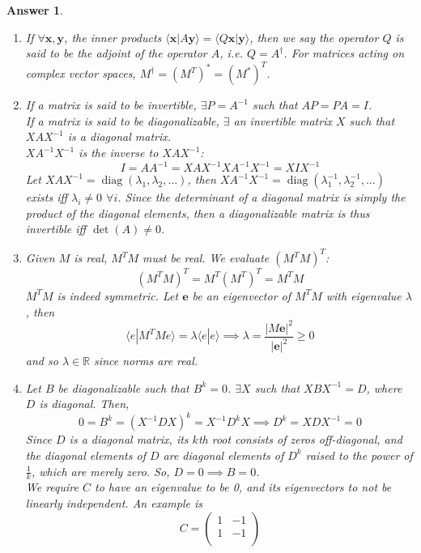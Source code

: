 \documentclass[a4paper]{article}
\DeclareMathOperator{\diag}{diag}
\newtheorem{ans}{Answer}[section]
\theoremstyle{new}
\begin{document}
\begin{ans}\leavevmode
\begin{enumerate}[label=(\alph*)]
\item If $\forall\mathbf{x},\mathbf{y}$, the inner products $\langle\mathbf{x}|A\mathbf{y}\rangle=\langle Q\mathbf{x}|\mathbf{y}\rangle$, then we say the operator $Q$ is said to be the adjoint of the operator $A$, i.e. $Q=A^\dag$. For matrices acting on complex vector spaces, $M^\dag=(M^T)^*=(M^*)^T$.
\item If a matrix is said to be invertible, $\exists P=A^{-1}$ such that $AP=PA=I$.\\[5pt]
If a matrix is said to be diagonalizable, $\exists$ an invertible matrix $X$ such that $XAX^{-1}$ is a diagonal matrix.\\[5pt]
$XA^{-1}X^{-1}$ is the inverse to $XAX^{-1}$:
$$I=AA^{-1}=XAX^{-1}XA^{-1}X^{-1}=XIX^{-1}$$
Let $XAX^{-1}=\diag(\lambda_1,\lambda_2,...)$, then $XA^{-1}X^{-1}=\diag(\lambda_1^{-1},\lambda_2^{-1},...)$ exists iff $\lambda_i\neq 0$ $\forall i$. Since the determinant of a diagonal matrix is simply the product of the diagonal elements, then a diagonalizable matrix is thus invertible iff $\det(A)\neq 0$.
\item Given $M$ is real, $M^TM$ must be real. We evaluate $(M^TM)^T$:
$$(M^TM)^T=M^T(M^T)^T=M^TM$$
$M^TM$ is indeed symmetric. Let $\mathbf{e}$ be an eigenvector of $M^TM$ with eigenvalue $\lambda$, then
$$\langle e|M^TMe\rangle=\lambda\langle e|e\rangle\implies\lambda=\frac{|M\mathbf{e}|^2}{|\mathbf{e}|^2}\geq0$$
and so $\lambda\in\mathbb{R}$ since norms are real.
\item Let $B$ be diagonalizable such that $B^k=0$. $\exists X$ such that $XBX^{-1}=D$, where $D$ is diagonal. Then,
$$0=B^k=(X^{-1}DX)^k=X^{-1}D^kX\implies D^k=XDX^{-1}=0$$
Since $D$ is a diagonal matrix, its $k$th root consists of zeros off-diagonal, and the diagonal elements of $D$ are diagonal elements of $D^k$ raised to the power of $\frac{1}{k}$, which are merely zero. So, $D=0\implies B=0$.\\[5pt]
We require $C$ to have an eigenvalue to be 0, and its eigenvectors to not be linearly independent. An example is
$$C=\begin{pmatrix}1&-1\\1&-1\\\end{pmatrix}$$
\end{enumerate}
\end{ans}
\newpage
\end{document}
